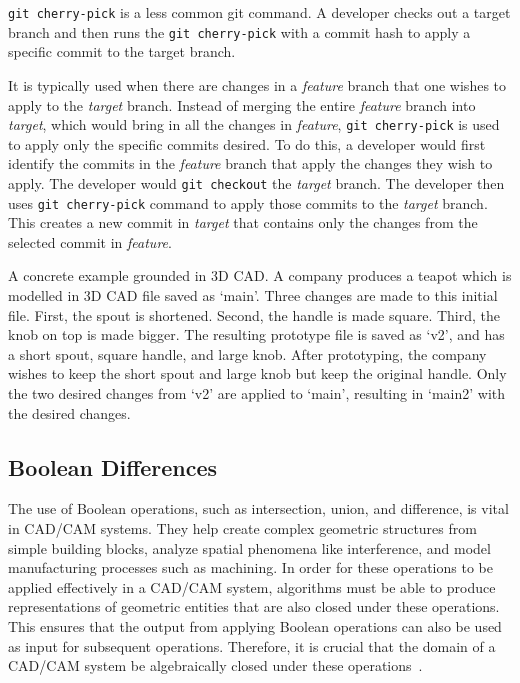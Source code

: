 \documentclass[sigconf,authorversion,nonacm]{acmart}
\begin{document}
\texttt{git cherry-pick} is a less common git command.
A developer checks out a target branch and then runs the \texttt{git cherry-pick} with a commit hash to apply a specific commit to the target branch.

It is typically used when there are changes in a \emph{feature} branch that one wishes to apply to the \emph{target} branch.
Instead of merging the entire \emph{feature} branch into \emph{target}, which would bring in all the changes in \emph{feature}, \texttt{git cherry-pick} is used to apply only the specific commits desired.
To do this, a developer would first identify the commits in the \emph{feature} branch that apply the changes they wish to apply.
The developer would \texttt{git checkout} the \emph{target} branch.
The developer then uses \texttt{git cherry-pick} command to apply those commits to the \emph{target} branch.
This creates a new commit in \emph{target} that contains only the changes from the selected commit in \emph{feature}.

A concrete example grounded in 3D CAD.
A company produces a teapot which is modelled in 3D CAD file saved as `main'.
Three changes are made to this initial file.
First, the spout is shortened.
Second, the handle is made square.
Third, the knob on top is made bigger.
The resulting prototype file is saved as `v2', and has a short spout, square handle, and large knob.
After prototyping, the company wishes to keep the short spout and large knob but keep the original handle.
Only the two desired changes from `v2' are applied to `main', resulting in `main2' with the desired changes.

\subsection{Boolean Differences}

The use of Boolean operations, such as intersection, union, and difference, is vital in CAD/CAM systems.
They help create complex geometric structures from simple building blocks, analyze spatial phenomena like interference, and model manufacturing processes such as machining.
In order for these operations to be applied effectively in a CAD/CAM system, algorithms must be able to produce representations of geometric entities that are also closed under these operations.
This ensures that the output from applying Boolean operations can also be used as input for subsequent operations.
Therefore, it is crucial that the domain of a CAD/CAM system be algebraically closed under these operations~\cite{tilove1980closure}.
\end{document}
